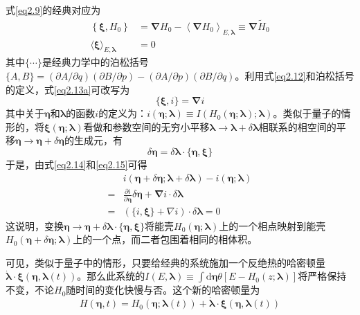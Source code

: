 式\ref{eq2.9}的经典对应为\cite{Jarzynski1995}
\begin{subequations}
    \begin{align}
        \left\{\boldsymbol{\xi}, H_{0}\right\} &=\boldsymbol{\nabla} H_{0}-\left\langle\boldsymbol{\nabla} H_{0}\right\rangle_{E, \boldsymbol{\lambda}} \equiv \boldsymbol{\nabla} \tilde{H}_{0}    \label{eq2.13a}\\
        \langle\boldsymbol{\xi}\rangle_{E, \boldsymbol{\lambda}} &=0 \label{eq2.13b}
    \end{align}
    \label{eq2.13}
\end{subequations}
其中$\{ \cdots \}$是经典力学中的泊松括号$\{A, B\}=(\partial A / \partial q)(\partial B / \partial p)-(\partial A / \partial p)(\partial B / \partial q)$。利用式\ref{eq2.12}和泊松括号的定义，式\ref{eq2.13a}可改写为
\begin{equation}
    \{\boldsymbol{\xi}, i\}=\boldsymbol{\nabla} i
  \label{eq2.14}
\end{equation}
其中关于$\bm{\eta}$和$\bm{\lambda}$的函数$i$的定义为：$i (\bm{\eta}; \bm{\lambda}) \equiv I \left( H_0\left( \bm{\eta}; \bm{\lambda}\right) ; \bm{\lambda} \right)$。类似于量子的情形的，将$\boldsymbol{\xi} (\bm{\eta}; \bm{\lambda})$看做和参数空间的无穷小平移$\boldsymbol{\lambda} \to \boldsymbol{\lambda} + \delta \boldsymbol{\lambda}$相联系的相空间的平移$\bm{\eta} \to \bm{\eta} + \delta \bm{\eta}$的生成元，有\cite{H.1986}
\begin{equation}
    \delta \bm{\eta}=\delta \boldsymbol{\lambda} \cdot\{\bm{\eta}, \boldsymbol{\xi}\}
  \label{eq2.15}
\end{equation}
于是，由式\ref{eq2.14}和\ref{eq2.15}可得
\begin{align}
    &i(\bm{\eta}+\delta \bm{\eta} ; \boldsymbol{\lambda}+\delta \boldsymbol{\lambda})-i(\bm{\eta} ; \boldsymbol{\lambda}) \\
    =&\frac{\partial i}{\partial \bm{\eta}} \delta \bm{\eta}+\boldsymbol{\nabla} i \cdot \delta \boldsymbol{\lambda} \\
    =&(\{i, \boldsymbol{\xi}\}+\nabla i) \cdot \delta \boldsymbol{\lambda}=0
    \label{eq2.16}
\end{align}
这说明，变换$\bm{\eta} \to \bm{\eta} + \delta  \bm{\lambda} \cdot \{\bm{\eta}, \boldsymbol{\xi}\}$将能壳$H_{0}(\bm{\eta} ; \boldsymbol{\lambda})$上的一个相点映射到能壳$H_{0}(\bm{\eta} + \delta \bm{\eta} ; \boldsymbol{\lambda})$上的一个点，而二者包围着相同的相体积。

可见，类似于量子中的情形，只要给经典的系统施加一个反绝热的哈密顿量$\dot{\boldsymbol{\lambda}} \cdot \boldsymbol{\xi}(\bm{\eta}, \boldsymbol{\lambda}(t))$。那么此系统的$I(E, \boldsymbol{\lambda}) \equiv \int \mathrm{d} \bm{\eta} \theta\left[E-H_{0}(z ; \boldsymbol{\lambda})\right]$将严格保持不变，不论$H_0 $随时间的变化快慢与否。这个新的哈密顿量为
\begin{equation}
    H(\bm{\eta}, t)=H_{0}(\bm{\eta} ; \boldsymbol{\lambda}(t))+\dot{\boldsymbol{\lambda}} \cdot \boldsymbol{\xi}(\bm{\eta}, \boldsymbol{\lambda}(t))
    \label{eq2.17}
\end{equation}

